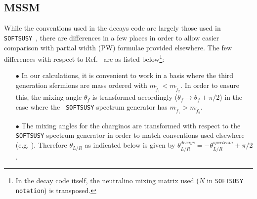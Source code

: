 \documentclass[final,3p,times]{elsarticle}
\begin{document}
\subsection{MSSM} \label{MSSMconventions}
While the conventions used in the decays code are largely those used in {\tt
  SOFTSUSY}~\cite{Allanach:2001kg}, there are differences in a few places in
order to allow easier comparison with partial width (PW) formulae provided
elsewhere. The few differences with respect to Ref.~\cite{Allanach:2001kg} are
as listed below\footnote{In the decay code itself, the neutralino mixing
  matrix used ($N$ in {\tt SOFTSUSY notation}) is transposed.}: 
\begin{itemize}
	\item[$\bullet$] In our calculations, it is convenient to work in a
          basis where the third generation sfermions are mass
          ordered with $m_{\tilde{f}_1} < m_{\tilde{f}_2}$. In order to ensure
          this, the mixing angle $\theta_f$ is transformed accordingly
          ($\theta_f \rightarrow \theta_f + \pi/2$) in the case where the {\tt
            SOFTSUSY} spectrum generator has $m_{\tilde{f}_1} >
          m_{\tilde{f}_2}$. 
	\item[$\bullet$] The mixing angles for the charginos are transformed
          with respect to the {\tt SOFTSUSY} spectrum generator in order to
          match conventions used elsewhere
          (e.g. \cite{Djouadi:2002ze}). Therefore $\theta_{L/R}$ as indicated
          below is given by $\theta_{L/R}^{decays} = -\theta_{L/R}^{spectrum}
          + \pi/2$. 
\end{itemize}
\end{document}
